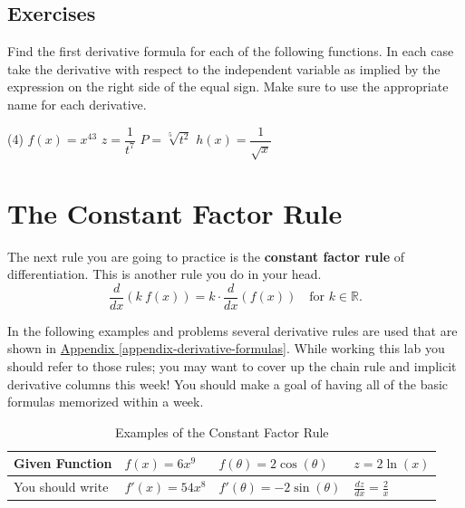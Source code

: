 \documentclass[12pt,]{book}
\newcommand{\terminology}[1]{\textbf{#1}}
\theoremstyle{plain}
\theoremstyle{definition}
\numberwithin{equation}{section}
\newcommand{\reals}{\mathbb{R}}
\newcommand{\fe}[2]{#1\mathopen{}\left(#2\right)\mathclose{}}
\newcommand{\fd}[1]{#1'}
\newcommand{\lz}[2]{\frac{d#1}{d#2}}
\newcommand{\lzoo}[2]{{\frac{d}{d#1}}{\left(#2\right)}}
\begin{document}
\subsection[Exercises]{Exercises}\label{exercises-33}
\hypertarget{exercisegroup-72}{\null}Find the first derivative formula for each of the following functions.  In each case take the derivative with respect to the independent variable as implied by the expression on the right side of the equal sign.  Make sure to use the appropriate name for each derivative.%
\par
\begin{exercisegroup}(4)
\exercise[1.]\hypertarget{exercise-353}{\null}\(\fe{f}{x}=x^{43}\)%
\exercise[2.]\hypertarget{exercise-354}{\null}\(z=\dfrac{1}{t^{7}}\)%
\exercise[3.]\hypertarget{exercise-355}{\null}\(P=\sqrt[5]{t^2}\)%
\exercise[4.]\hypertarget{exercise-356}{\null}\(\fe{h}{x}=\dfrac{1}{\sqrt{x}}\)%
\end{exercisegroup}
\par\smallskip\noindent
\typeout{************************************************}
\typeout{************************************************}
\section[The Constant Factor Rule]{The Constant Factor Rule}\label{section-constant-factor-rule}
The next rule you are going to practice is the \terminology{constant factor rule} of differentiation.  This is another rule you do in your head. \begin{equation}\lzoo{x}{k\ \fe{f}{x}}=k\cdot\lzoo{x}{\fe{f}{x}}\quad\text{for }k\in\reals\text{.}\label{men-3}\end{equation}%
\par
In the following examples and problems several derivative rules are used that are shown in \hyperref[appendix-derivative-formulas]{Appendix \ref{appendix-derivative-formulas}}.  While working this lab you should refer to those rules; you may want to cover up the chain rule and implicit derivative columns this week!  You should make a goal of having all of the basic formulas memorized within a week.%
\begin{table}
\centering
\caption{Examples of the Constant Factor Rule\label{table-constant-factor-rule}}
\begin{tabular}{l|l|l|l}
\toprule
Given Function&\(\fe{f}{x}=6x^9\)&\(\fe{f}{\theta}=2\fe{\cos}{\theta}\)&\(z=2\fe{\ln}{x}\)\\
\midrule
You should write&\(\fe{\fd{f}}{x}=54x^8\)&\(\fe{\fd{f}}{\theta}=-2\fe{\sin}{\theta}\)&\(\lz{z}{x}=\frac{2}{x}\)\\
\bottomrule
\end{tabular}
\end{table}
\typeout{************************************************}
\typeout{************************************************}
\end{document}
